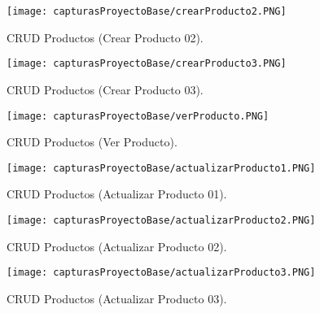 \documentclass[titlepage, 12pt]{article}
\begin{document}
    
     \begin{figure}[h]
        \caption{CRUD Productos (Crear Producto 02).}
        \centering
        \texttt{[image: capturasProyectoBase/crearProducto2.PNG]} \par\vspace{0.5cm}
    \end{figure}
    
    \clearpage
    
    \begin{figure}[h]
        \caption{CRUD Productos (Crear Producto 03).}
        \centering
        \texttt{[image: capturasProyectoBase/crearProducto3.PNG]} \par\vspace{0.5cm}
    \end{figure}
    
    \begin{figure}[h]
        \caption{CRUD Productos (Ver Producto).}
        \centering
        \texttt{[image: capturasProyectoBase/verProducto.PNG]} \par\vspace{0.5cm}
    \end{figure}
    
    \clearpage
    
    \begin{figure}[h]
        \caption{CRUD Productos (Actualizar Producto 01).}
        \centering
        \texttt{[image: capturasProyectoBase/actualizarProducto1.PNG]} \par\vspace{0.5cm}
    \end{figure}
    
    \begin{figure}[h]
        \caption{CRUD Productos (Actualizar Producto 02).}
        \centering
        \texttt{[image: capturasProyectoBase/actualizarProducto2.PNG]} \par\vspace{0.5cm}
    \end{figure}
    
    \clearpage
    
    \begin{figure}[h]
        \caption{CRUD Productos (Actualizar Producto 03).}
        \centering
        \texttt{[image: capturasProyectoBase/actualizarProducto3.PNG]} \par\vspace{0.5cm}
    \end{figure}
    
\end{document}
